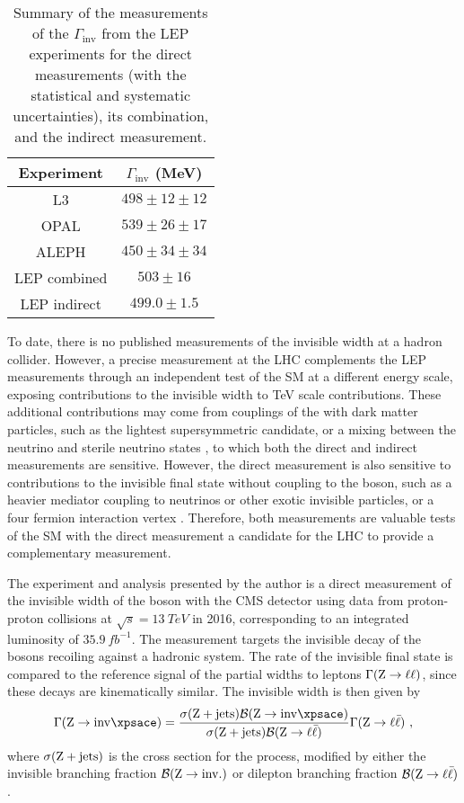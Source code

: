 \begin{table}[htb]
    \centering
    \begin{tabular}{cc}
         \hline\hline
         Experiment & $\Gamma_{\mathrm{inv}}$ (MeV) \\
         \hline
         L3 & $498\pm 12\pm 12$ \\
         OPAL & $539\pm 26\pm 17$ \\
         ALEPH & $450\pm 34\pm 34$ \\
         LEP combined & $503\pm 16$ \\
         \hline
         LEP indirect & $499.0\pm 1.5$ \\
         \hline
    \end{tabular}
    \caption{
        Summary of the measurements of the $\Gamma_{\mathrm{inv}}$ from the LEP experiments for the direct measurements (with the statistical and systematic uncertainties), its combination, and the indirect measurement.
    }
    \label{tab:lep-zinv-width}
\end{table}

To date, there is no published measurements of the \PZ invisible width at a
hadron collider. However, a precise measurement at the LHC complements the LEP
measurements through an independent test of the SM at a different energy
scale, exposing contributions to the invisible width to TeV scale
contributions. These additional contributions may come from couplings of the
\PZ with dark matter particles, such as the lightest supersymmetric candidate,
or a mixing between the neutrino and sterile neutrino states
\cite{Carena:2003aj}, to which both the direct and indirect measurements are
sensitive. However, the direct measurement is also sensitive to
contributions to the invisible final state without coupling to the \PZ boson,
such as a heavier mediator coupling to neutrinos or other exotic invisible
particles, or a four fermion interaction vertex \cite{Carena:2003aj}.
Therefore, both measurements are valuable tests of the SM with the direct
measurement a candidate for the LHC to provide a complementary measurement.

The experiment and analysis presented by the author is a direct measurement of
the invisible width of the \PZ boson with the CMS detector using data from
proton-proton collisions at ${\sqrt{s}=\SI{13}{TeV}}$ in 2016, corresponding
to an integrated luminosity of $\SI{35.9}{fb^{-1}}$. The measurement targets
the invisible decay of the \PZ bosons recoiling against a hadronic system. The
rate of the invisible final state is compared to the reference signal of the
partial widths to leptons $\Gamma(\mathrm{Z}\rightarrow\ell\ell)$, since these decays are
kinematically similar. The invisible width is then given by
%
\begin{equation}\label{eq:zinv}
    \Gamma(\IZinv) = \frac{\sigma(\IZj)\mathcal{B}(\IZinv)}{\sigma(\IZj)\mathcal{B}(\IZll)}\Gamma(\IZll)\ ,
\end{equation}
%
where $\sigma({\mathrm{Z}+\mathrm{jets}})$ is the cross section for the \IZj process, modified by
either the invisible branching fraction $\mathcal{B}(\mathrm{Z}\rightarrow\mathrm{inv.})$ or
dilepton branching fraction $\mathcal{B}({\mathrm{Z}\rightarrow \ell\bar{\ell}})$.